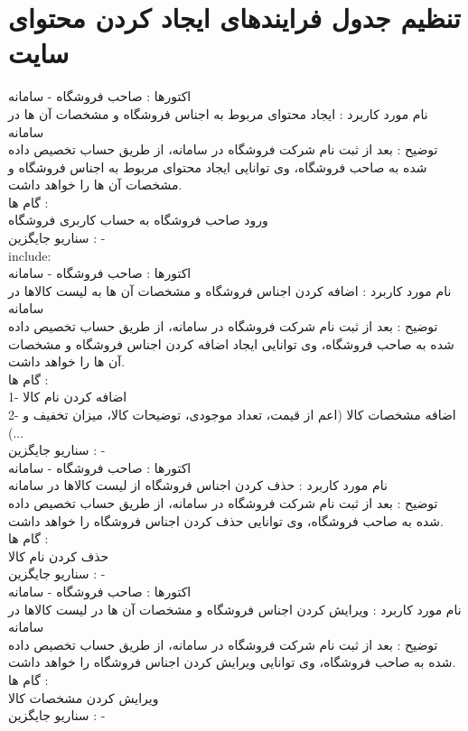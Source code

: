 \documentclass[12pt]{report}
\begin{document}
\section{تنظیم جدول فرایندهای ایجاد کردن محتوای سایت}
اکتورها : صاحب فروشگاه - سامانه\\
نام مورد کاربرد : ایجاد محتوای مربوط به اجناس فروشگاه و مشخصات آن ها در سامانه \\
توضیح : بعد از ثبت نام شرکت فروشگاه در سامانه، از طریق حساب تخصیص داده شده به صاحب فروشگاه، وی توانایی ایجاد محتوای مربوط به اجناس فروشگاه و مشخصات آن ها را خواهد داشت. \\
گام ها :\\
ورود صاحب فروشگاه به حساب کاربری فروشگاه\\ 
سناریو جایگزین : -\\
include:\\
اکتورها : صاحب فروشگاه - سامانه\\
نام مورد کاربرد : اضافه کردن اجناس فروشگاه و مشخصات آن ها به لیست کالاها در سامانه\\ 
توضیح : بعد از ثبت نام شرکت فروشگاه در سامانه، از طریق حساب تخصیص داده شده به صاحب فروشگاه، وی توانایی ایجاد اضافه کردن اجناس فروشگاه و مشخصات آن ها را خواهد داشت. \\
گام ها :\\
1- اضافه کردن نام کالا\\
2- اضافه مشخصات کالا (اعم از قیمت، تعداد موجودی، توضیحات کالا، میزان تخفیف و ...)\\
سناریو جایگزین : -\\
اکتورها : صاحب فروشگاه - سامانه\\
نام مورد کاربرد : حذف کردن اجناس فروشگاه از لیست کالاها در سامانه \\
توضیح : بعد از ثبت نام شرکت فروشگاه در سامانه، از طریق حساب تخصیص داده شده به صاحب فروشگاه، وی توانایی حذف کردن اجناس فروشگاه را خواهد داشت. \\
گام ها :\\
حذف کردن نام کالا\\
سناریو جایگزین : -\\
اکتورها : صاحب فروشگاه - سامانه\\
نام مورد کاربرد : ویرایش کردن اجناس فروشگاه و مشخصات آن ها در لیست کالاها در سامانه \\
توضیح : بعد از ثبت نام شرکت فروشگاه در سامانه، از طریق حساب تخصیص داده شده به صاحب فروشگاه، وی توانایی ویرایش کردن اجناس فروشگاه را خواهد داشت. \\
گام ها :\\
ویرایش کردن مشخصات کالا\\
سناریو جایگزین : -
\end{document}
